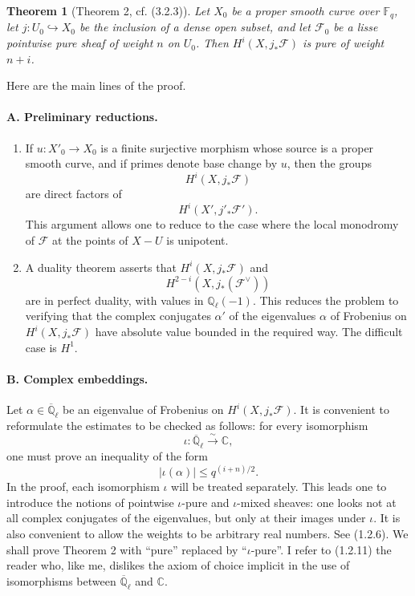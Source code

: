 \documentclass[11pt]{article}
\newtheorem{theorem}{Theorem}
\theoremstyle{remark}
\newcommand{\Ql}{\mathbb{Q}_\ell}
\newcommand{\CC}{\mathbb{C}}
\newcommand{\Fq}{\mathbb{F}_q}
\newcommand{\Abar}{\overline{\mathbb{Q}}_\ell}
\begin{document}
\begin{theorem}[Theorem 2, cf. (3.2.3)]
Let $X_0$ be a proper smooth curve over $\Fq$, let $j:U_0\hookrightarrow X_0$ be the inclusion of a dense open subset, and let $\mathcal F_0$ be a lisse pointwise pure sheaf of weight $n$ on $U_0$. Then $H^i(X,j_{*}\mathcal F)$ is pure of weight $n+i$.
\end{theorem}

Here are the main lines of the proof.

\paragraph{A. Preliminary reductions.}
\begin{enumerate}[label=(\roman*)]
\item If $u:X'_0\to X_0$ is a finite surjective morphism whose source is a proper smooth curve, and if primes denote base change by $u$, then the groups
\[
H^i(X,j_{*}\mathcal F)
\]
are direct factors of
\[
H^i(X',j'_*\mathcal F').
\]
This argument allows one to reduce to the case where the local monodromy of $\mathcal F$ at the points of $X-U$ is unipotent.
\item A duality theorem asserts that $H^i(X,j_{*}\mathcal F)$ and
\[
H^{2-i}(X,j_{*}(\mathcal F^\vee))
\]
are in perfect duality, with values in $\Ql(-1)$. This reduces the problem to verifying that the complex conjugates $\alpha'$ of the eigenvalues $\alpha$ of Frobenius on $H^i(X,j_{*}\mathcal F)$ have absolute value bounded in the required way. The difficult case is $H^1$.
\end{enumerate}

\paragraph{B. Complex embeddings.}
Let $\alpha\in \Abar$ be an eigenvalue of Frobenius on $H^i(X,j_{*}\mathcal F)$. It is convenient to reformulate the estimates to be checked as follows: for every isomorphism
\[
\iota:\Abar\xrightarrow{\sim}\CC,
\]
one must prove an inequality of the form
\[
|\iota(\alpha)|\le q^{(i+n)/2}.
\]
In the proof, each isomorphism $\iota$ will be treated separately. This leads one to introduce the notions of pointwise $\iota$-pure and $\iota$-mixed sheaves: one looks not at all complex conjugates of the eigenvalues, but only at their images under $\iota$. It is also convenient to allow the weights to be arbitrary real numbers. See (1.2.6). We shall prove Theorem 2 with ``pure'' replaced by ``$\iota$-pure''. I refer to (1.2.11) the reader who, like me, dislikes the axiom of choice implicit in the use of isomorphisms between $\Abar$ and $\CC$.
\end{document}
